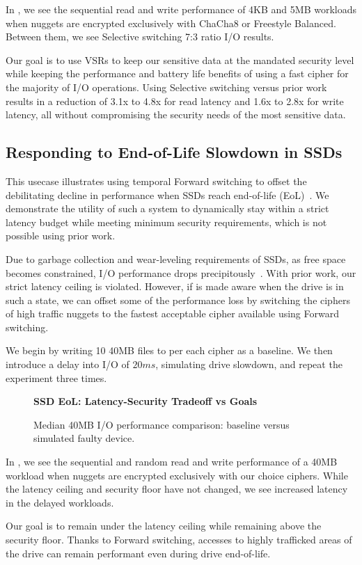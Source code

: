 In , we see the sequential read and write performance of
4KB and 5MB workloads when nuggets are encrypted exclusively with ChaCha8 or
Freestyle Balanced. Between them, we see Selective switching 7:3 ratio I/O
results.

Our goal is to use VSRs to keep our sensitive data at the mandated security
level while keeping the performance and battery life benefits of using a fast
cipher for the majority of I/O operations. Using \sys Selective switching
versus prior work results in a reduction of 3.1x to 4.8x for read latency and
1.6x to 2.8x for write latency, all without compromising the security needs of
the most sensitive data.

\subsection{Responding to End-of-Life Slowdown in SSDs} \label{subsec:uc3}

This usecase illustrates using temporal Forward switching to offset the
debilitating decline in performance when SSDs reach end-of-life
(EoL)~\cite{SSDEOL1}. We demonstrate the utility of such a system to dynamically
stay within a strict latency budget while meeting minimum security requirements,
which is not possible using prior work.

Due to garbage collection and wear-leveling requirements of SSDs, as free space
becomes constrained, I/O performance drops precipitously~\cite{SSDEOL1}. With
prior work, our strict latency ceiling is violated. However, if \sys is
made aware when the drive is in such a state, we can offset some of the
performance loss by switching the ciphers of high traffic nuggets to the fastest
acceptable cipher available using Forward switching.

We begin by writing 10 40MB files to \sys per each cipher as a baseline.
We then introduce a delay into \sys I/O of $20ms$, simulating drive
slowdown, and repeat the experiment three times.

\begin{figure}[ht] \textbf{SSD EoL: Latency-Security Tradeoff vs
   Goals}\par\medskip {} \caption{Median
   40MB I/O performance comparison: baseline versus simulated faulty device.}
  \label{fig:usecase-eol-tradeoff}
\end{figure}

In , we see the sequential and random read and
write performance of a 40MB workload when nuggets are encrypted exclusively with
our choice ciphers. While the latency ceiling and security floor have not
changed, we see increased latency in the delayed workloads.

Our goal is to remain under the latency ceiling while remaining above
the security floor. Thanks to Forward switching, accesses to highly
trafficked areas of the drive can remain performant even during drive
end-of-life.  
